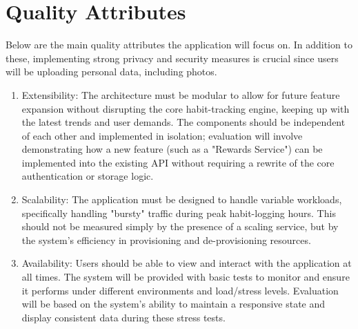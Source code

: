 \section*{Quality Attributes}
Below are the main quality attributes the application will focus on. 
In addition to these, implementing strong privacy and security measures is crucial since users will be uploading personal data, including photos.
\begin{enumerate}
\item Extensibility: The architecture must be modular to allow for future feature expansion without disrupting the core habit-tracking engine, keeping up with the latest trends and user demands. The components should be independent of each other and implemented in isolation; evaluation will involve demonstrating how a new feature (such as a "Rewards Service") can be implemented into the existing API without requiring a rewrite of the core authentication or storage logic.
\item Scalability: The application must be designed to handle variable workloads, specifically handling "bursty" traffic during peak habit-logging hours. This should not be measured simply by the presence of a scaling service, but by the system's efficiency in provisioning and de-provisioning resources.
\item Availability: Users should be able to view and interact with the application at all times. The system will be provided with basic tests to monitor and ensure it performs under different environments and load/stress levels. Evaluation will be based on the system's ability to maintain a responsive state and display consistent data during these stress tests.
\end{enumerate}

